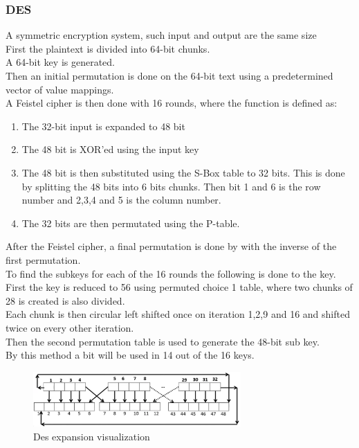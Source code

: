 \documentclass[12pt, a4paper]{article}
\begin{document}
			\subsubsection{DES}
				A symmetric encryption system, such input and output are the same size\\
				First the plaintext is divided into 64-bit chunks.\\
				A 64-bit key is generated.\\
				Then an initial permutation is done on the 64-bit text using a predetermined vector of value mappings.\\
				A Feistel cipher is then done with 16 rounds, where the function is defined as:\\
				\begin{enumerate}
					\item The 32-bit input is expanded to 48 bit 
					\item The 48 bit is XOR'ed using the input key 
					\item The 48 bit is then substituted using the S-Box table to 32 bits. This is done by splitting the 48 bits into 6 bits chunks. Then bit 1 and 6 is the row number and 2,3,4 and 5 is the column number.
					\item The 32 bits are then permutated using the P-table.
				\end{enumerate}
				After the Feistel cipher, a final permutation is done by with the inverse of the first permutation.\\[4mm]
				To find the subkeys for each of the 16 rounds the following is done to the key.\\
				First the key is reduced to 56 using permuted choice 1 table, where two chunks of 28 is created is also divided.\\
				Each chunk is then circular left shifted once on iteration 1,2,9 and 16 and shifted twice on every other iteration.\\
				Then the second permutation table is used to generate the 48-bit sub key.\\
				By this method a bit will be used in 14 out of the 16 keys.
				\begin{figure}[h!]
					\includegraphics[width=300px]{assets/desExpansion.png}
					\centering
					\caption{Des expansion visualization}
				\end{figure}
\end{document}
